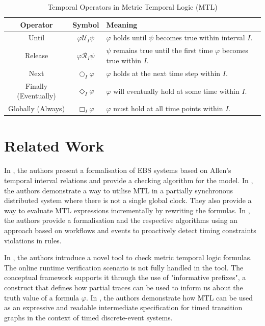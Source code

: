 \documentclass[twocolumn]{article}
\begin{document}
\begin{table}[h]
	\small\centering
	\renewcommand{\arraystretch}{1.5}
	\begin{tabular}{|c|c|l|}
		\hline
		\textbf{Operator}    & \textbf{Symbol}              & \textbf{Meaning}                                                            \\
		\hline
		Until                & $\varphi \mathcal{U}_I \psi$ & $\varphi$ holds until $\psi$ becomes true within interval $I$.              \\
		\hline
		Release              & $\varphi \mathcal{R}_I \psi$ & $\psi$ remains true until the first time $\varphi$ becomes true within $I$. \\
		\hline
		Next                 & $\bigcirc_I \varphi$         & $\varphi$ holds at the next time step within $I$.                           \\
		\hline
		Finally (Eventually) & $\Diamond_I \varphi$         & $\varphi$ will eventually hold at some time within $I$.                     \\
		\hline
		Globally (Always)    & $\Box_I \varphi$             & $\varphi$ must hold at all time points within $I$.                          \\
		\hline
	\end{tabular}
	\caption{Temporal Operators in Metric Temporal Logic (MTL)}
	\label{table:mtl_operators}
\end{table}


\section{Related Work}

In \cite{trinh_checking_2024}, the authors present a formalisation of EBS systems based on Allen's \cite{allen_maintaining_1983} temporal interval relations and provide a checking algorithm for the model.
In \cite{ganguly_distributed_2024}, the authors demonstrate a way to utilise MTL in a partially synchronous distributed system where there is not a single global clock. They also provide a way to evaluate MTL expressions incrementally by rewriting the formulas.
In \cite{mackey_early_2024}, the authors provide a formalisation and the respective algorithms using an approach based on workflows and events to proactively detect timing constraints violations in rules.

In \cite{hendriks_checking_2016}, the authors introduce a novel tool to check metric temporal logic formulas. The online runtime verification scenario is not fully handled in the tool.
The conceptual framework supports it through the use of "informative prefixes", a construct that defines how partial traces can be used to inform us about the truth value of a formula $\varphi$.
In \cite{dhananjayan_metric_2014}, the authors demonstrate how MTL can be used as an expressive and readable intermediate specification for timed transition graphs in the context of timed discrete-event systems.
\end{document}
